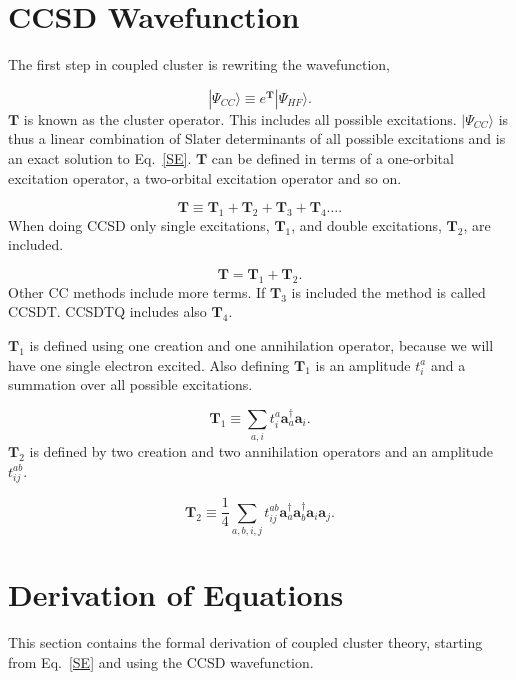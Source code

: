 \documentclass[graybox,sectrefs,envcountresetchap,open=right]{svmonodo}
\begin{document}
\section{CCSD Wavefunction}
The first step in coupled cluster is rewriting the wavefunction,

\begin{equation}
|\Psi_{CC} \rangle \equiv e^{\mathbf{T}} | \Psi_{HF} \rangle .
\end{equation} 
$\mathbf{T}$ is known as the cluster operator. This includes all possible excitations. $|\Psi_{CC} \rangle$ is thus a linear combination of Slater determinants of all possible excitations and is an exact solution to Eq.~\ref{SE}. $\mathbf{T}$ can be defined in terms of a one-orbital excitation operator, a two-orbital excitation operator and so on.

\begin{equation}
\mathbf{T} \equiv \mathbf{T}_1 + \mathbf{T}_2 + \mathbf{T}_3 + \mathbf{T}_4 \dots .
\end{equation} 
When doing CCSD only single excitations, $\mathbf{T}_1$, and double excitations, $\mathbf{T}_2$, are included. 

\begin{equation}
\mathbf{T} = \mathbf{T}_1 + \mathbf{T}_2 .
\end{equation} 
Other CC methods include more terms. If $\mathbf{T}_3$ is included the method is called CCSDT. CCSDTQ includes also $\mathbf{T}_4$. 

$\mathbf{T}_1$ is defined using one creation and one annihilation operator, because we will have one single electron excited. Also defining $\mathbf{T}_1$ is an amplitude $t_i^a$ and a summation over all possible excitations.  

\begin{equation}
\mathbf{T}_1 \equiv \sum_{a,i} t_i^a \mathbf{a}^{\dagger}_a \mathbf{a}_i . \label{t1defi}
\end{equation} 
$\mathbf{T}_2$ is defined by two creation and two annihilation operators and an amplitude $t_{ij}^{ab}$.

\begin{equation}
\mathbf{T}_2 \equiv \frac{1}{4} \sum_{a,b,i,j} t_{ij}^{ab} \mathbf{a}^{\dagger}_a \mathbf{a}^{\dagger}_b \mathbf{a}_i \mathbf{a}_j . \label{t2defi}
\end{equation} 

\section{Derivation of Equations}
This section contains the formal derivation of coupled cluster theory, starting from Eq.~\ref{SE} and using the CCSD wavefunction. 
\end{document}
